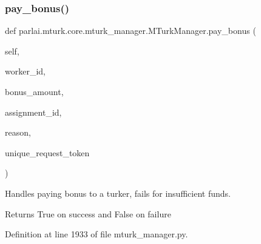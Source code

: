 \subsubsection{\texorpdfstring{pay\+\_\+bonus()}{pay\_bonus()}}
{\footnotesize\ttfamily def parlai.\+mturk.\+core.\+mturk\+\_\+manager.\+M\+Turk\+Manager.\+pay\+\_\+bonus (\begin{DoxyParamCaption}\item[{}]{self,  }\item[{}]{worker\+\_\+id,  }\item[{}]{bonus\+\_\+amount,  }\item[{}]{assignment\+\_\+id,  }\item[{}]{reason,  }\item[{}]{unique\+\_\+request\+\_\+token }\end{DoxyParamCaption})}

\begin{DoxyVerb}Handles paying bonus to a turker, fails for insufficient funds.

Returns True on success and False on failure
\end{DoxyVerb}
 

Definition at line 1933 of file mturk\+\_\+manager.\+py.


